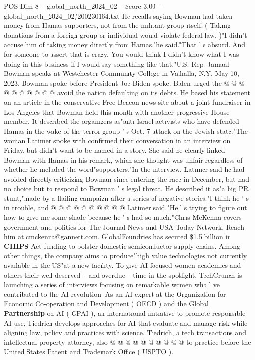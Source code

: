 \begin{textsample}{POS Dim 8 – global\_north\_2024\_02 – Score 3.00 – global\_north\_2024\_02/200230164.txt}
He recalls saying Bowman had taken money from Hamas supporters, not from the militant group itself. ( Taking donations from a foreign group or individual would violate federal law. )"I didn't accuse him of taking money directly from Hamas,"he said."That ' s absurd.
And for someone to assert that is crazy.
You would think I didn't know what I was doing in this business if I would say something like that."U.S.
Rep.
Jamaal Bowman speaks at Westchester Community College in Valhalla, N.Y.
May 10, 2023.
Bowman spoke before President Joe Biden spoke.
Biden urged the @ @ @ @ @ @ @ @ @ @ avoid the nation defaulting on its debts.
He based his statement on an article in the conservative Free Beacon news site about a joint fundraiser in Los Angeles that Bowman held this month with another progressive House member.
It described the organizers as"anti-Israel activists who have defended Hamas in the wake of the terror group ' s Oct. 7 attack on the Jewish state."The woman Latimer spoke with confirmed their conversation in an interview on Friday, but didn't want to be named in a story.
She said he clearly linked Bowman with Hamas in his remark, which she thought was unfair regardless of whether he included the word"supporters."In the interview, Latimer said he had avoided directly criticizing Bowman since entering the race in December, but had no choice but to respond to Bowman ' s legal threat.
He described it as"a big PR stunt,"made by a flailing campaign after a series of negative stories."I think he ' s in trouble, and @ @ @ @ @ @ @ @ @ @ Latimer said."He ' s trying to figure out how to give me some shade because he ' s had so much."Chris McKenna covers government and politics for The Journal News and USA Today Network.
Reach him at cmckenna@gannett.com.
GlobalFoundries has secured \$1.5 billion in \textbf{CHIPS} Act funding to bolster domestic semiconductor supply chains.
Among other things, the company aims to produce"high value technologies not currently available in the US"at a new facility.
To give AI-focused women academics and others their well-deserved -- and overdue -- time in the spotlight, TechCrunch is launching a series of interviews focusing on remarkable women who ' ve contributed to the AI revolution.
As an AI expert at the Organization for Economic Co-operation and Development ( OECD ) and the Global \textbf{Partnership} on AI ( GPAI ), an international initiative to promote responsible AI use, Tiedrich develops approaches for AI that evaluate and manage risk while aligning law, policy and practices with science.
Tiedrich, a tech transactions and intellectual property attorney, also @ @ @ @ @ @ @ @ @ @ to practice before the United States Patent and Trademark Office ( USPTO ).

\end{textsample}
